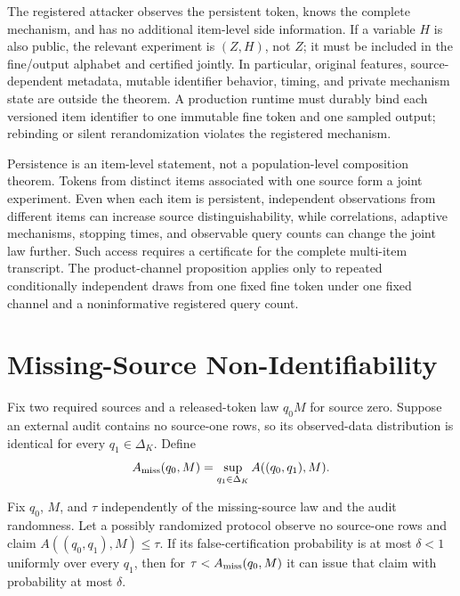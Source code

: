 The registered attacker observes the persistent token, knows the complete
mechanism, and has no additional item-level side information. If a variable
$H$ is also public, the relevant experiment is $(Z,H)$, not $Z$; it must be
included in the fine/output alphabet and certified jointly. In particular,
original features, source-dependent metadata, mutable identifier behavior,
timing, and private mechanism state are outside the theorem. A production
runtime must durably bind each versioned item identifier to one immutable fine
token and one sampled output; rebinding or silent rerandomization violates the
registered mechanism.

Persistence is an item-level statement, not a population-level composition
theorem. Tokens from distinct items associated with one source form a joint
experiment. Even when each item is persistent, independent observations from
different items can increase source distinguishability, while correlations,
adaptive mechanisms, stopping times, and observable query counts can change the
joint law further. Such access requires a certificate for the complete
multi-item transcript. The product-channel proposition applies only to repeated
conditionally independent draws from one fixed fine token under one fixed
channel and a noninformative registered query count.

\section{Missing-Source Non-Identifiability}

Fix two required sources and a released-token law $q_0M$ for source zero.
Suppose an external audit contains no source-one rows, so its observed-data
distribution is identical for every $q_1\in\Delta_K$. Define
\begin{equation}
 A_{\rm miss}(q_0,M)=\sup_{q_1\in\Delta_K}A((q_0,q_1),M).
 \label{supp:eq:missing}
\end{equation}

\begin{theorem}
Fix $q_0$, $M$, and $\tau$ independently of the missing-source law and the
audit randomness. Let a possibly randomized protocol observe no source-one rows and claim
$A((q_0,q_1),M)\leq\tau$. If its false-certification probability is at most
$\delta<1$ uniformly over every $q_1$, then for
$\tau<A_{\rm miss}(q_0,M)$ it can issue that claim with probability at most
$\delta$.
\end{theorem}

